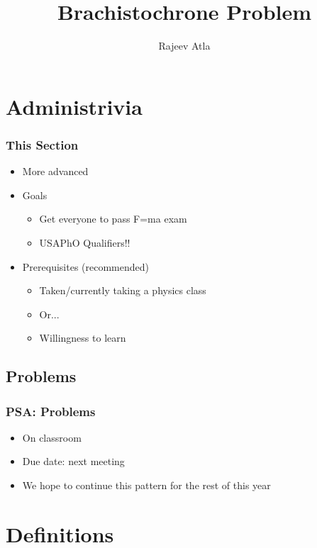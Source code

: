 \documentclass[12pt]{beamer}
\title{Brachistochrone Problem}
\author{Rajeev Atla}
\institute{Physics Club}
\begin{document}
\frame{\titlepage}

\section{Administrivia}
\begin{frame}
\frametitle{This Section}
\begin{itemize}
    \pause
    \item More advanced
    \pause
    \item Goals
    \begin{itemize}
        \pause
        \item Get everyone to pass F=ma exam
        \pause
        \item USAPhO Qualifiers!!
    \end{itemize}
    \pause
    \item Prerequisites (recommended)
    \begin{itemize}
        \pause
        \item Taken/currently taking a physics class
        \pause
        \item Or...
        \pause
        \item Willingness to learn
    \end{itemize}
\end{itemize}
\end{frame}

\subsection{Problems}
\begin{frame}
\frametitle{PSA: Problems}
\begin{itemize}
    \item On classroom
    \pause
    \item Due date: next meeting
    \pause
    \item We hope to continue this pattern for the rest of this year
\end{itemize}
\end{frame}

\section{Definitions}
\end{document}
